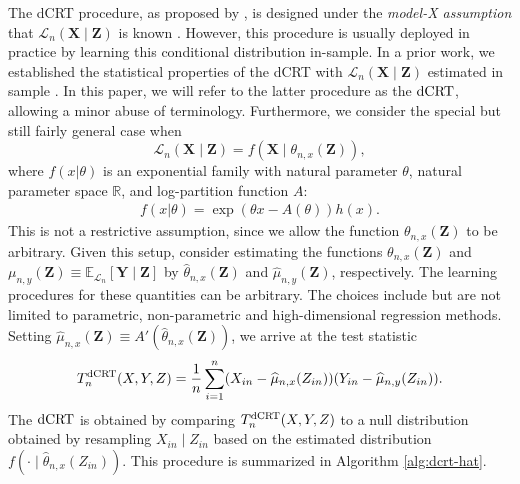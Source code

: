 \documentclass[12pt]{article}
\theoremstyle{definition}
\newcommand{\E}{\mathbb E}								%
\newcommand{\R}{\mathbb{R}}								%
\newcommand{\prx}{\bm X}								%
\newcommand{\srx}{X}									%
\newcommand{\prz}{\bm Z}								%
\newcommand{\srz}{Z}									%
\newcommand{\pry}{{\bm Y}}								%
\newcommand{\sry}{Y}									%
\newcommand{\law}{\mathcal L}							%
\newcommand{\dCRT}{\textnormal{dCRT}} 					%
\begin{document}
  The dCRT procedure, as proposed by \citet{Liu2022a}, is designed under the \textit{model-X assumption} that $\law_n(\prx \mid \prz)$ is known \citep{CetL16}. However, this procedure is usually deployed in practice by learning this conditional distribution in-sample. In a prior work, we established the statistical properties of the dCRT with $\law_n(\prx \mid \prz)$ estimated in sample \citep{Niu2022a}. In this paper, we will refer to the latter procedure as the $\dCRT$, allowing a minor abuse of terminology. Furthermore, we consider the special but still fairly general case when 
  \begin{equation}
  \law_n(\prx \mid \prz) = f(\prx \mid \theta_{n,x}(\prz)), 
  \end{equation}
  where $f(x|\theta)$ is an exponential family with natural parameter $\theta$, natural parameter space $\R$, and log-partition function $A$:
  \begin{align}\label{eq:NEF}
  f(x|\theta)=\exp(\theta x -A(\theta))h(x).
  \end{align}
  This is not a restrictive assumption, since we allow the function $\theta_{n,x}(\prz)$ to be arbitrary. Given this setup, consider estimating the functions $\theta_{n,x}(\prz)$ and $\mu_{n,y}(\prz) \equiv \E_{\law_n}[\pry \mid \prz]$ by $\widehat{\theta}_{n,x}(\prz)$ and $\widehat \mu_{n,y}(\prz)$, respectively. The learning procedures for these quantities can be arbitrary. The choices include but are not limited to parametric, non-parametric and high-dimensional regression methods. Setting $\widehat \mu_{n,x}(\prz) \equiv A'(\widehat{\theta}_{n,x}(\prz))$, we arrive at the test statistic 
  \begin{align}\label{eq:dCRThat}
	  T_n^{\dCRT}(X,Y,Z)
	=\frac{1}{n}\sum_{i=1}^{n}(\srx_{in}-\widehat\mu_{n,x}(\srz_{in}))(\sry_{in}-\widehat{\mu}_{n,y}(\srz_{in})).
  \end{align}
  The $\dCRT$ is obtained by comparing $T_n^{\dCRT}(\srx, \sry, \srz)$ to a null distribution obtained by resampling $\srx_{in} \mid \srz_{in}$ based on the estimated distribution $f(\cdot \mid \widehat \theta_{n,x}(Z_{in})).$ This procedure is summarized in Algorithm \ref{alg:dcrt-hat}. 
\end{document}
